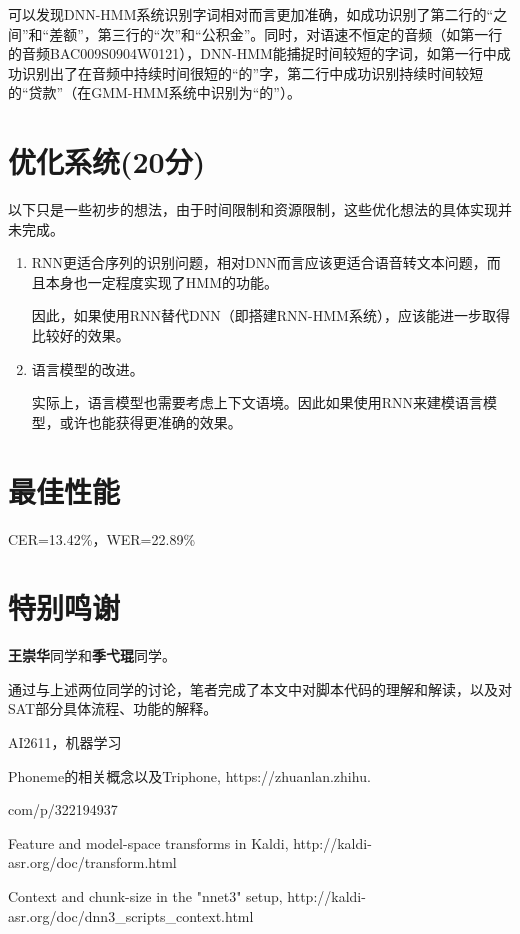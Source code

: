\documentclass[a4paper]{article}
\begin{document}
可以发现DNN-HMM系统识别字词相对而言更加准确，如成功识别了第二行的“之间”和“差额”，第三行的“次”和“公积金”。同时，对语速不恒定的音频（如第一行的音频BAC009S0904W0121），DNN-HMM能捕捉时间较短的字词，如第一行中成功识别出了在音频中持续时间很短的“的”字，第二行中成功识别持续时间较短的“贷款”（在GMM-HMM系统中识别为“的”）。

\section{优化系统(20分)}

以下只是一些初步的想法，由于时间限制和资源限制，这些优化想法的具体实现并未完成。

\begin{enumerate}
\item RNN更适合序列的识别问题，相对DNN而言应该更适合语音转文本问题，而且本身也一定程度实现了HMM的功能。

因此，如果使用RNN替代DNN（即搭建RNN-HMM系统），应该能进一步取得比较好的效果。
    
\item 语言模型的改进。

实际上，语言模型也需要考虑上下文语境。因此如果使用RNN来建模语言模型，或许也能获得更准确的效果。
\end{enumerate}

\vspace{6em}

\section{最佳性能}

CER=13.42\%，WER=22.89\%

\section{特别鸣谢}
\textbf{王崇华}同学和\textbf{季弋琨}同学。

通过与上述两位同学的讨论，笔者完成了本文中对脚本代码的理解和解读，以及对SAT部分具体流程、功能的解释。

\begin{thebibliography}{}

 AI2611，机器学习

 Phoneme的相关概念以及Triphone, https://zhuanlan.zhihu.

com/p/322194937

 Feature and model-space transforms in Kaldi, http://kaldi-asr.org/doc/transform.html

 Context and chunk-size in the "nnet3" setup, http://kaldi-asr.org/doc/dnn3\_scripts\_context.html

\end{thebibliography}
\end{document}
